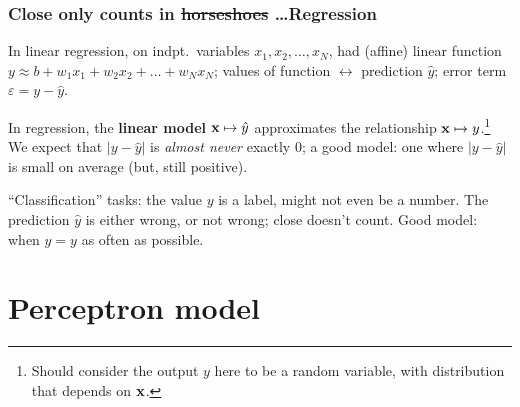 \documentclass{beamer}
\theoremstyle{example}
\begin{document}
\begin{frame}
\frametitle{Close only counts in \sout{horseshoes} \ldots Regression}
In linear regression, on indpt.\ variables $x_1,x_2,\ldots,x_{N}$, had (affine) linear function $y \approx b + w_1x_1+w_2x_{2}+\ldots+w_{N}x_{N}$; \newline 
values of function $\leftrightarrow$ prediction $\hat{y}$; error term $\varepsilon = y - \hat{y}$.

\pause
In regression, the \textbf{linear model} ${\bf x} \mapsto \hat{y}$ approximates the relationship ${\bf x} \mapsto y$.\footnote{Should consider the output $y$ here to be a random variable, with distribution that depends on ${\bf x}$.} We expect that $|y - \hat{y}|$ is \emph{almost never} exactly 0; a good model: one where $|y - \hat{y}|$ is small on average (but, still positive).

\pause 
``Classification'' tasks: the value $y$ is a label, might not even be a number. The prediction $\hat{y}$ is either wrong, or not wrong; close doesn't count. Good model: when
$\hat{y} = y$ as often as possible.
\end{frame}

\section{Perceptron model}
\end{document}
